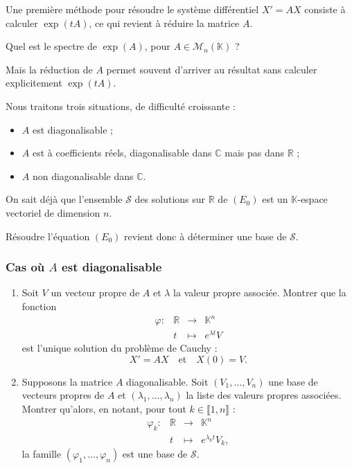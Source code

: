 \documentclass[french]{article}
\newcommand{\R}{\mathbb{R}}
\newcommand{\C}{\mathbb{C}}
\newcommand{\K}{\mathbb{K}}
\theoremstyle{plain}
\theoremstyle{definition}
\theoremstyle{remark}
\begin{document}
Une première méthode pour résoudre le système différentiel $X'=AX$ consiste à calculer $\exp(tA)$, ce qui revient à réduire la matrice $A$.

\begin{exo}
	Quel est le spectre de $\exp(A)$, pour $A\in\mathcal{M}_n(\K)$ ?
\end{exo}

Mais la réduction de $A$ permet souvent d'arriver au résultat sans calculer explicitement $\exp(tA)$.

Nous traitons trois situations, de difficulté croissante :
\begin{itemize}
	\item $A$ est diagonalisable ;
	\item $A$ est à coefficients réels, diagonalisable dans $\C$ mais pas dans $\R$ ;
	\item $A$ non diagonalisable dans $\C$.
\end{itemize}

On sait déjà que l'ensemble $\mathcal{S}$ des solutions sur $\R$ de $(E_0)$ est un $\K$-espace vectoriel de dimension $n$.

Résoudre l'équation $(E_0)$ revient donc à déterminer une base de $\mathcal{S}$.

\subsubsection*{Cas où $A$ est diagonalisable}

\begin{exo}
	\begin{enumerate}
		\item Soit $V$ un vecteur propre de $A$ et $\lambda$ la valeur propre associée. Montrer que la fonction $$\begin{array}{lrcl}
			\varphi:&\R&\longrightarrow&\K^n\\
			&t&\longmapsto&e^{\lambda t}V
		\end{array}$$ est l'unique solution du problème de Cauchy :
		$$X'=AX\quad\text{et}\quad X(0)=V.$$
		\item Supposons la matrice $A$ diagonalisable. Soit $(V_1,\ldots,V_n)$ une base de vecteurs propres de $A$ et $(\lambda_1,\ldots,\lambda_n)$ la liste des valeurs propres associées.\\
		Montrer qu'alors, en notant, pour tout $k\in\llbracket1,n\rrbracket$ :
		$$\begin{array}{lrcl}
			\varphi_k:&\R&\longrightarrow&\K^n\\
			&t&\longmapsto&e^{\lambda_k t}V_k,
		\end{array}$$ la famille $(\varphi_1,\ldots,\varphi_n)$ est une base de $\mathcal{S}$.
	\end{enumerate}
\end{exo}
\end{document}
